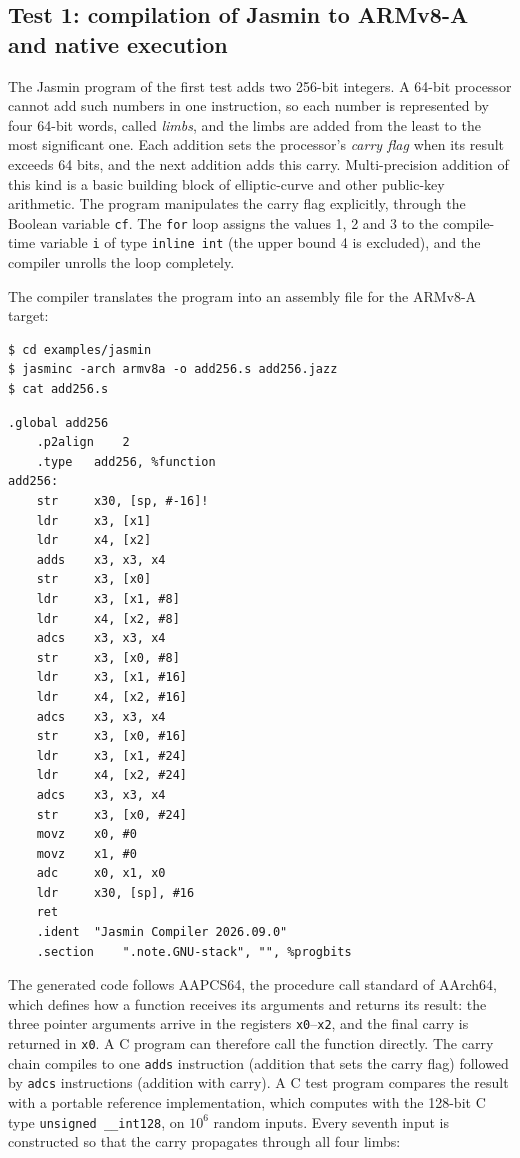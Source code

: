 \documentclass[11pt,a4paper]{article}
\newcommand{\file}[1]{\texttt{#1}}
\begin{document}
\subsection{Test 1: compilation of Jasmin to ARMv8-A and native execution}

The Jasmin program of the first test adds two 256-bit integers. A 64-bit processor cannot
add such numbers in one instruction, so each number is represented by four
64-bit words, called \emph{limbs}, and the limbs are added from the least to
the most significant one. Each addition sets the processor's \emph{carry
flag} when its result exceeds 64 bits, and the next addition adds this
carry. Multi-precision addition of this kind is a basic building block of
elliptic-curve and other public-key arithmetic. The program manipulates the
carry flag explicitly, through the Boolean variable \texttt{cf}. The
\texttt{for} loop assigns the values 1, 2 and 3 to the compile-time variable
\texttt{i} of type \texttt{inline int} (the upper bound 4 is excluded), and
the compiler unrolls the loop completely.



The compiler translates the program into an assembly file for the ARMv8-A
target:

\begin{lstlisting}[style=shell]
$ cd examples/jasmin
$ jasminc -arch armv8a -o add256.s add256.jazz
$ cat add256.s
\end{lstlisting}

\begin{lstlisting}[style=asm,caption={AArch64 assembly generated by \texttt{jasminc} (\file{add256.s})}]
	.global	add256
	.p2align	2
	.type	add256, %function
add256:
	str 	x30, [sp, #-16]!
	ldr 	x3, [x1]
	ldr 	x4, [x2]
	adds	x3, x3, x4
	str 	x3, [x0]
	ldr 	x3, [x1, #8]
	ldr 	x4, [x2, #8]
	adcs	x3, x3, x4
	str 	x3, [x0, #8]
	ldr 	x3, [x1, #16]
	ldr 	x4, [x2, #16]
	adcs	x3, x3, x4
	str 	x3, [x0, #16]
	ldr 	x3, [x1, #24]
	ldr 	x4, [x2, #24]
	adcs	x3, x3, x4
	str 	x3, [x0, #24]
	movz	x0, #0
	movz	x1, #0
	adc 	x0, x1, x0
	ldr 	x30, [sp], #16
	ret
	.ident	"Jasmin Compiler 2026.09.0"
	.section	".note.GNU-stack", "", %progbits
\end{lstlisting}

The generated code follows AAPCS64, the procedure call standard of AArch64,
which defines how a function receives its arguments and returns its result:
the three pointer arguments arrive in the registers
\texttt{x0}--\texttt{x2}, and the final carry is returned in \texttt{x0}.
A C program can therefore call the function directly. The carry chain
compiles to one \texttt{adds} instruction (addition that sets the carry
flag) followed by \texttt{adcs} instructions (addition with carry). A C test
program compares the result with a portable reference implementation, which
computes with the 128-bit C type \texttt{unsigned \_\_int128}, on $10^6$
random inputs. Every seventh input is constructed so that the carry
propagates through all four limbs:
\end{document}
